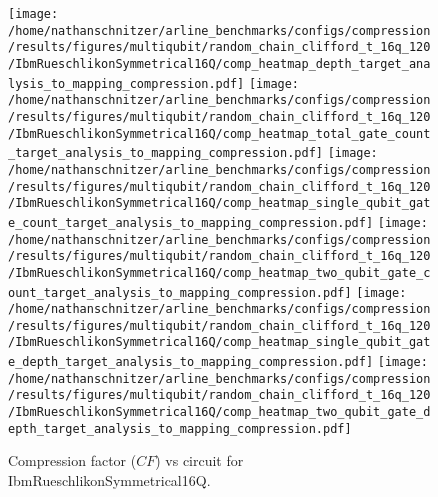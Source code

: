 \documentclass{report}%
\begin{document}
\begin{figure}[h!]%
\centering%
\texttt{[image: /home/nathanschnitzer/arline\_benchmarks/configs/compression/results/figures/multiqubit/random\_chain\_clifford\_t\_16q\_120/IbmRueschlikonSymmetrical16Q/comp\_heatmap\_depth\_target\_analysis\_to\_mapping\_compression.pdf]}%
\centering%
\texttt{[image: /home/nathanschnitzer/arline\_benchmarks/configs/compression/results/figures/multiqubit/random\_chain\_clifford\_t\_16q\_120/IbmRueschlikonSymmetrical16Q/comp\_heatmap\_total\_gate\_count\_target\_analysis\_to\_mapping\_compression.pdf]}%
\linebreak%
\centering%
\texttt{[image: /home/nathanschnitzer/arline\_benchmarks/configs/compression/results/figures/multiqubit/random\_chain\_clifford\_t\_16q\_120/IbmRueschlikonSymmetrical16Q/comp\_heatmap\_single\_qubit\_gate\_count\_target\_analysis\_to\_mapping\_compression.pdf]}%
\centering%
\texttt{[image: /home/nathanschnitzer/arline\_benchmarks/configs/compression/results/figures/multiqubit/random\_chain\_clifford\_t\_16q\_120/IbmRueschlikonSymmetrical16Q/comp\_heatmap\_two\_qubit\_gate\_count\_target\_analysis\_to\_mapping\_compression.pdf]}%
\linebreak%
\centering%
\texttt{[image: /home/nathanschnitzer/arline\_benchmarks/configs/compression/results/figures/multiqubit/random\_chain\_clifford\_t\_16q\_120/IbmRueschlikonSymmetrical16Q/comp\_heatmap\_single\_qubit\_gate\_depth\_target\_analysis\_to\_mapping\_compression.pdf]}%
\centering%
\texttt{[image: /home/nathanschnitzer/arline\_benchmarks/configs/compression/results/figures/multiqubit/random\_chain\_clifford\_t\_16q\_120/IbmRueschlikonSymmetrical16Q/comp\_heatmap\_two\_qubit\_gate\_depth\_target\_analysis\_to\_mapping\_compression.pdf]}%
\linebreak%
\caption{Compression factor ($CF$) vs circuit for IbmRueschlikonSymmetrical16Q.}%
\end{figure}
\end{document}
